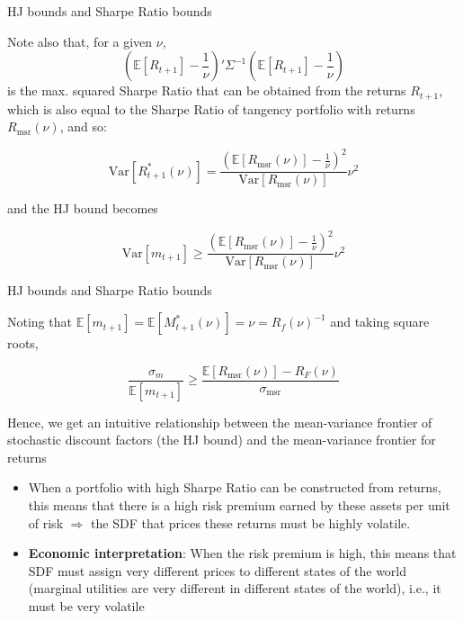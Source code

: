 \documentclass[xcolor=table, aspectratio=169]{beamer}
\newcommand{\E}{\mathbb{E}}
\newcommand{\alertbf}[1]{\alert{\textbf{#1}}}
\begin{document}
\begin{frame}{HJ bounds and Sharpe Ratio bounds}

Note also that, for a given $\nu$,
$$\left(\E[R_{t+1}] -\frac{1}{\nu}\right)'\Sigma^{-1}\left(\E[R_{t+1}] -\frac{1}{\nu}\right)$$
is the max. squared Sharpe Ratio that can be obtained from the returns $R_{t+1}$, which is also equal to the Sharpe Ratio of tangency portfolio with returns $R_\text{msr}(\nu)$, and so:

$$\text{Var}[R^*_{t+1}(\nu)] = \dfrac{(\E[R_\text{msr}(\nu)]- \frac{1}{\nu})^2}{\text{Var}[R_\text{msr}(\nu)]}\nu^2$$

and the HJ bound becomes

$$\text{Var}[m_{t+1}] \geq \dfrac{(\E[R_\text{msr}(\nu)]-\frac{1}{\nu})^2}{\text{Var}[R_\text{msr}(\nu)]}\nu^2 $$
\end{frame}


\begin{frame}{HJ bounds and Sharpe Ratio bounds}

Noting that $\E[m_{t+1}] = \E[M^*_{t+1}(\nu)]= \nu = R_f(\nu)^{-1}$ and taking square roots,

$$\dfrac{\sigma_m}{\E[m_{t+1}]} \geq \dfrac{\E[R_\text{msr}(\nu)]-R_F(\nu)}{\sigma_\text{msr}}$$

Hence, we get an intuitive relationship between the mean-variance frontier of stochastic discount factors (the HJ bound) and the mean-variance frontier for returns

\begin{itemize}

\item When a portfolio with high Sharpe Ratio can be constructed from returns, this means that there is a high risk premium earned by these assets per unit of risk $\Rightarrow$ the SDF that prices these returns must be highly volatile. 

\item \alertbf{Economic interpretation}: When the risk premium is high, this means that SDF must assign very different prices to different states of the world (marginal utilities are very different in different states of the world), i.e., it must be very volatile 

\end{itemize}

\end{frame}
\end{document}
